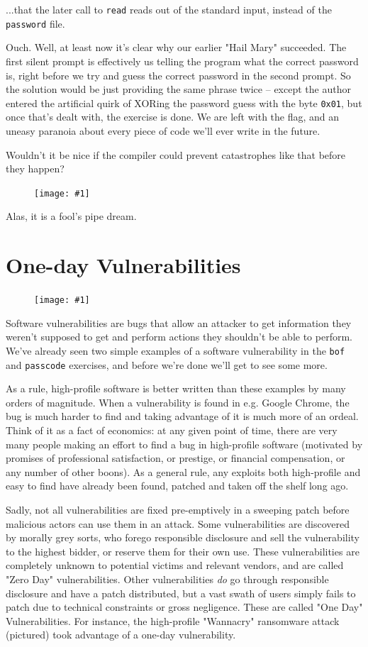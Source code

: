 \documentclass{article}
\newcommand{\displayimage}[1] {
\begin{figure}[H]
    \centering
    \texttt{[image: \#1]} 
\end{figure}
}
\newcommand{\wrapimageright}[1] {
    \begin{figure}
        \begin{center}
            \texttt{[image: \#1]} 
        \end{center}
    \end{figure}
}
\newcommand{\xcode}[2]{\colorbox{ubuntuback}{\lstinline[language=#1]|#2|}}
\newcommand{\code}[1]{\colorbox{ubuntuback}{\texttt{#1}}}
\begin{document}
...that the later call to \xcode{C}{read} reads out of the standard input, instead of the \code{password} file.

Ouch. Well, at least now it's clear why our earlier "Hail Mary" succeeded. The first silent prompt is effectively us telling the program what the correct password is, right before we try and guess the correct password in the second prompt. So the solution would be just providing the same phrase twice -- except the author entered the artificial quirk of XORing the password guess with the byte \code{0x01}, but once that's dealt with, the exercise is done. We are left with the flag, and an uneasy paranoia about every piece of code we'll ever write in the future.

Wouldn't it be nice if the compiler could prevent catastrophes like that before they happen?

\displayimage{../08_mistake/in_rust.png}

Alas, it is a fool's pipe dream.

\section{One-day Vulnerabilities}

\wrapimageright{./images/wannacry.jpg}
Software vulnerabilities are bugs that allow an attacker to get information they weren't supposed to get and perform actions they shouldn't be able to perform. We've already seen two simple examples of a software vulnerability in the \code{bof} and \code{passcode} exercises, and before we're done we'll get to see some more.

As a rule, high-profile software is better written than these examples by many orders of magnitude. When a vulnerability is found in e.g. Google Chrome, the bug is much harder to find and taking advantage of it is much more of an ordeal. Think of it as a fact of economics: at any given point of time, there are very many people making an effort to find a bug in high-profile software (motivated by promises of professional satisfaction, or prestige, or financial compensation, or any number of other boons). As a general rule, any exploits both high-profile and easy to find have already been found, patched and taken off the shelf long ago.

Sadly, not all vulnerabilities are fixed pre-emptively in a sweeping patch before malicious actors can use them in an attack. Some vulnerabilities are discovered by morally grey sorts, who forego responsible disclosure and sell the vulnerability to the highest bidder, or reserve them for their own use. These vulnerabilities are completely unknown to potential victims and relevant vendors, and are called "Zero Day" vulnerabilities. Other vulnerabilities \textit{do} go through responsible disclosure and have a patch distributed, but a vast swath of users simply fails to patch due to technical constraints or gross negligence. These are called "One Day" Vulnerabilities. For instance, the high-profile "Wannacry" ransomware attack (pictured) took advantage of a one-day vulnerability.
\end{document}
